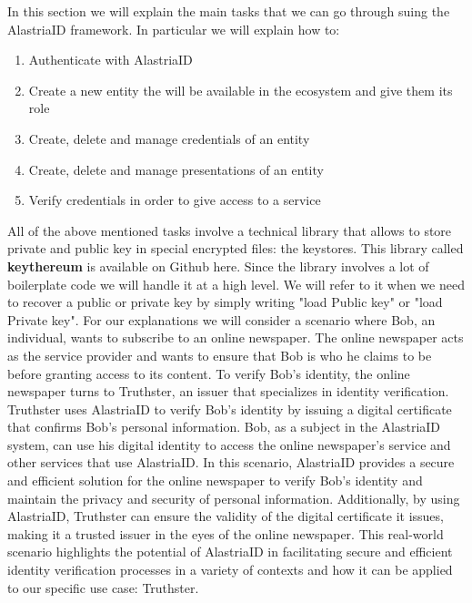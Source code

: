 \documentclass[target=mst,aauheader=]{thud}
\begin{document}
In this section we will explain the main tasks that we can go through suing the AlastriaID framework.
In particular we will explain how to:

\begin{enumerate}

    \item Authenticate with AlastriaID
    \item Create a new entity the will be available in the ecosystem and give them its role
    \item Create, delete and manage credentials of an entity
    \item Create, delete and manage presentations of an entity
    \item Verify credentials in order to give access to a service

\end{enumerate}

All of the above mentioned tasks involve a technical library that allows to store private and public key in special encrypted files: the keystores. This library called \textbf{keythereum} is available on Github here\cite{keythereum}. Since the library involves a lot of boilerplate code we will handle it at a high level. We will refer to it when we need to recover a public or private key by simply writing "load Public key" or "load Private key".
For our explanations we will consider a scenario where Bob, an individual, wants to subscribe to an online newspaper. The online newspaper acts as the service provider and wants to ensure that Bob is who he claims to be before granting access to its content. To verify Bob's identity, the online newspaper turns to Truthster, an issuer that specializes in identity verification. Truthster uses AlastriaID to verify Bob's identity by issuing a digital certificate that confirms Bob's personal information. Bob, as a subject in the AlastriaID system, can use his digital identity to access the online newspaper's service and other services that use AlastriaID. In this scenario, AlastriaID provides a secure and efficient solution for the online newspaper to verify Bob's identity and maintain the privacy and security of personal information. Additionally, by using AlastriaID, Truthster can ensure the validity of the digital certificate it issues, making it a trusted issuer in the eyes of the online newspaper. This real-world scenario highlights the potential of AlastriaID in facilitating secure and efficient identity verification processes in a variety of contexts and how it can be applied to our specific use case: Truthster.
\end{document}
